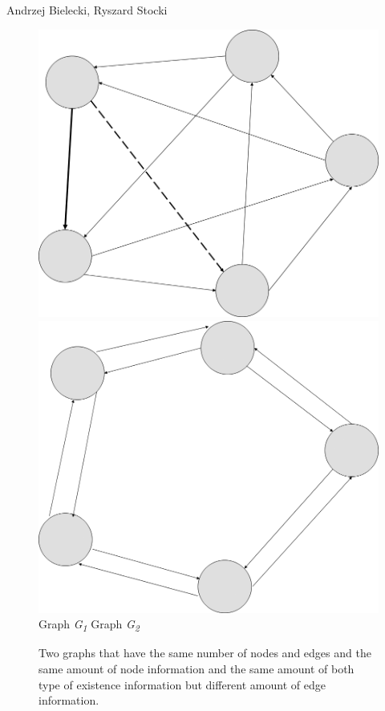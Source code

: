 \begin{artengenv2auth}{Andrzej Bielecki, Ryszard Stocki}
\begin{figure}
 \begin{center}
 \includegraphics[width=.5\textwidth]{ART_Bielecki/InfoStructcorrectedcopyeditedPP-img002.png}%
 \includegraphics[width=.5\textwidth]{ART_Bielecki/InfoStructcorrectedcopyeditedPP-img003.png}%
 Graph \textit{G}\textit{\textsubscript{1}}  Graph \textit{G}\textit{\textsubscript{2}}
 \end{center}%
 \caption{Two graphs that have the same number of nodes and edges and the same amount of node information and the same amount of both type of existence information but different amount of edge information.}\label{bie:fig2}
\end{figure}






\end{artengenv2auth}
